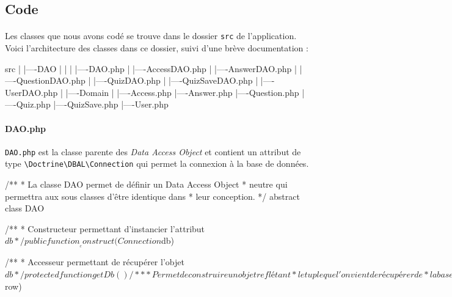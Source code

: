 \documentclass[12pt]{article}
\begin{document}
    \subsection{Code}
        \paragraph{} Les classes que nous avons codé se trouve dans le dossier \verb+src+ de l'application. Voici l'architecture des classes dans ce dossier, suivi d'une brève documentation :
        
        \begin{verbatimtab}
        src
        |
        |----DAO
        |    |
        |    |----DAO.php
        |    |----AccessDAO.php
        |    |----AnswerDAO.php
        |    |----QuestionDAO.php
        |    |----QuizDAO.php
        |    |----QuizSaveDAO.php
        |    |----UserDAO.php
        |
        |----Domain
             |
             |----Access.php
             |----Answer.php
             |----Question.php
             |----Quiz.php
             |----QuizSave.php
             |----User.php
        \end{verbatimtab}
        
        \paragraph{DAO.php}
        \verb+DAO.php+ est la classe parente des \emph{Data Access Object} et contient un attribut de type \verb+\Doctrine\DBAL\Connection+ qui permet la connexion à la base de données.
        
        \begin{verbatimtab}
        /**
         * La classe DAO permet de définir un Data Access Object
         * neutre qui permettra aux sous classes d'être identique dans
         * leur conception.
         */
        abstract class DAO
        
        /**
         * Constructeur permettant d'instancier l'attribut $db
         */
        public function __construct(Connection $db)
        
        /**
         * Accesseur permettant de récupérer l'objet $db
         */
        protected function getDb()

        /**
         * Permet de construire un objet reflétant 
         * le tuple que l'on vient de récupérer de 
         * la base de données.
         */
        protected abstract function buildDomainObject($row)     
        \end{verbatimtab} 
        
\end{document}
